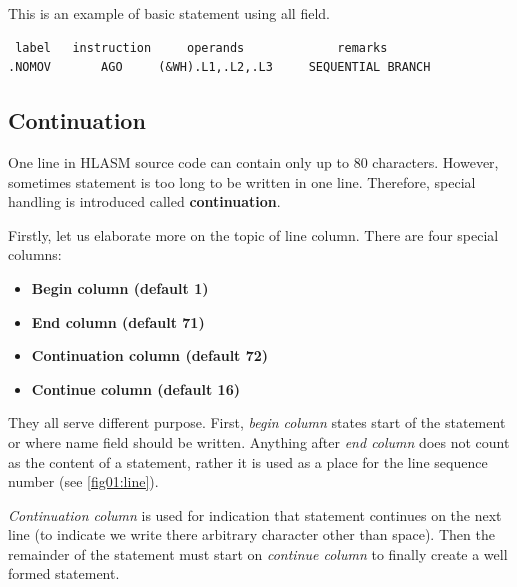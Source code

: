 This is an example of basic statement using all field.
\begin{verbatim}
 label   instruction     operands             remarks
.NOMOV       AGO     (&WH).L1,.L2,.L3     SEQUENTIAL BRANCH
\end{verbatim}

\subsection{Continuation}

One line in HLASM source code can contain only up to 80 characters. However, sometimes statement is too long to be written in one line. Therefore, special handling is introduced called \textbf{continuation}.

Firstly, let us elaborate more on the topic of line column. There are four special columns:
\begin{itemize}
	\item \textbf{Begin column (default 1)}
	
	\item \textbf{End column (default 71)}
	
	\item \textbf{Continuation column (default 72)}
	
	\item \textbf{Continue column (default 16)}
\end{itemize}
They all serve different purpose. First, \textit{begin column} states start of the statement or where name field should be written. Anything after \textit{end column} does not count as the content of a statement, rather it is used as a place for the line sequence number (see \ref{fig01:line}). 

\textit{Continuation column} is used for indication that statement continues on the next line (to indicate we write there arbitrary character other than space). Then the remainder of the statement must start on \textit{continue column} to finally create a well formed statement.

